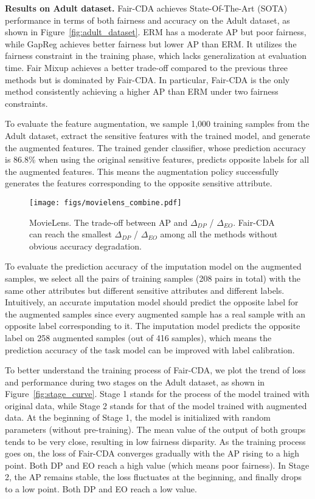 \documentclass[letterpaper]{article} %
\begin{document}
\noindent\textbf{Results on Adult dataset.} Fair-CDA achieves State-Of-The-Art (SOTA) performance in terms of both fairness and accuracy on the Adult dataset, as shown in Figure~\ref{fig:adult_dataset}. ERM has a moderate AP but poor fairness, while GapReg achieves better fairness but lower AP than ERM. It utilizes the fairness constraint in the training phase, which lacks generalization at evaluation time. 
Fair Mixup achieves a better trade-off compared to the previous three methods but is dominated by Fair-CDA. In particular, Fair-CDA is the only method consistently achieving a higher AP than ERM under two fairness constraints.

To evaluate the feature augmentation, we sample 1,000 training samples from the Adult dataset, extract the sensitive features with the trained model, and generate the augmented features.  
The trained gender classifier, whose prediction accuracy is 86.8\% when using the original sensitive features, predicts opposite labels for all the augmented features.
This means the augmentation policy successfully generates the features corresponding to the opposite sensitive attribute.


\begin{figure}[t]
	\centering
	\texttt{[image: figs/movielens\_combine.pdf]}
	\caption{{MovieLens.} The trade-off between AP and $\Delta_{DP}$ / $\Delta_{EO}$. 
	Fair-CDA can reach the smallest $\Delta_{DP}$ / $\Delta_{EO}$ among all the methods without obvious accuracy degradation.}
	\label{fig:movielens}
\end{figure} 


To evaluate the prediction accuracy of the imputation model on the augmented samples, we select all the pairs of training samples (208 pairs in total) with the same other attributes but different sensitive attributes and different labels. Intuitively, an accurate imputation model should predict the opposite label for the augmented samples since every augmented sample has a real sample with an opposite label corresponding to it. The imputation model predicts the opposite label on 258 augmented samples (out of 416 samples), which means the prediction accuracy of the task model can be improved with label calibration. 


To better understand the training process of Fair-CDA, we plot the trend of loss and performance during two stages on the Adult dataset, as shown in Figure~\ref{fig:stage_curve}. Stage 1 stands for the process of the model trained with original data, while Stage 2 stands for that of the model trained with augmented data. %
At the beginning of Stage 1, the model is initialized with random parameters (without pre-training). The mean value
of the output of both groups tends to be very close, resulting in low fairness disparity. As the training process goes
on, the loss of Fair-CDA converges gradually with the AP rising to a high point. Both DP and EO reach a high value (which means poor fairness). In Stage 2, the AP remains stable, the loss fluctuates at the beginning, and finally drops to a low point. Both DP and EO reach a low value. %
\end{document}
